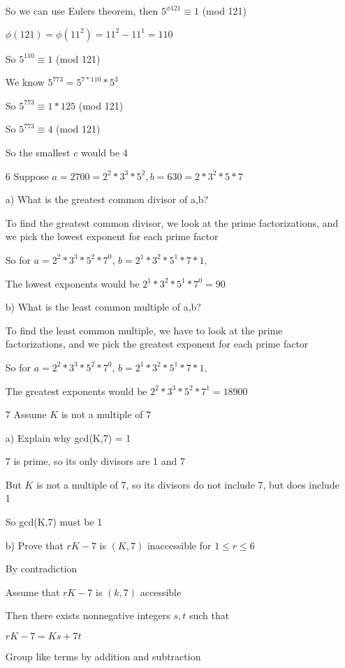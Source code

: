 \documentclass[11pt]{article}
\begin{document}
\begin{itemize}
  So we can use Eulers theorem, then $5^{\phi{121}} \equiv 1$ (mod 121)

  $\phi(121) = \phi(11^2) = 11^2 - 11^1 = 110$

  So $5^{110} \equiv 1$ (mod 121)

  We know $5^{773} = 5^{7*110}*5^{3}$

  So $5^{773} \equiv 1*125$ (mod 121)

  So $5^{773} \equiv 4$ (mod 121)

  So the smallest $c$ would be 4

\item[6] Suppose $a = 2700 = 2^2*3^3*5^2, b = 630 = 2*3^2*5*7$

  a) What is the greatest common divisor of a,b?

  To find the greatest common divisor, we look at the prime factorizations, and we pick the lowest exponent for each prime factor

  So for $a = 2^2 * 3^3 * 5^2* 7^0$, $b = 2^1*3^2*5^1*7*1$,

  The lowest exponents would be $2^1*3^2*5^1*7^0 = 90$

  b) What is the least common multiple of a,b?

  To find the least common multiple, we have to look at the prime factorizations, and we pick the greatest exponent for each prime factor

  So for $a = 2^2 * 3^3 * 5^2* 7^0$, $b = 2^1*3^2*5^1*7*1$,

  The greatest exponents would be $2^2 * 3^3 * 5^2 * 7^1 = 18900$

\item[7] Assume $K$ is not a multiple of $7$

  a) Explain why gcd(K,7) = 1

  7 is prime, so its only divisors are 1 and 7

  But $K$ is not a multiple of 7, so its divisors do not include 7, but does include 1

  So gcd(K,7) must be 1

  b) Prove that $rK - 7$ is $(K,7)$ inaccessible for $1 \leq r \leq 6$

  By contradiction

  Assume that $rK -7$ is $(k,7)$ accessible

  Then there exists nonnegative integers $s,t$ such that

  $rK - 7 = Ks + 7t$

  Group like terms by addition and subtraction


\end{itemize}
\end{document}
